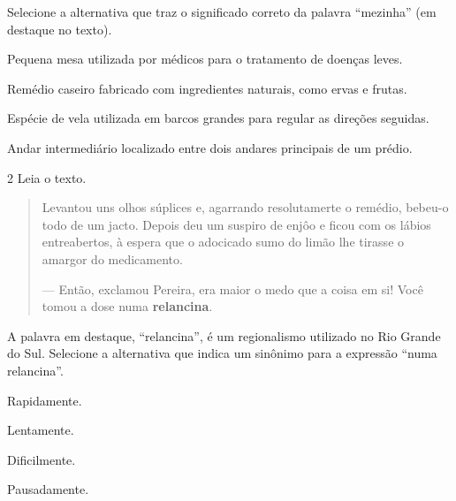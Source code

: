 \noindent{}Selecione a alternativa que traz o significado correto da palavra “mezinha” (em destaque no texto).

\begin{escolha}
\item Pequena mesa utilizada por médicos para o tratamento de doenças leves.

\item Remédio caseiro fabricado com ingredientes naturais, como ervas e frutas.

\item Espécie de vela utilizada em barcos grandes para regular as direções seguidas.

\item Andar intermediário localizado entre dois andares principais de um prédio.
\end{escolha}


\num{2} Leia o texto.

\begin{quote}
Levantou uns olhos súplices e, agarrando resolutamerte o remédio,
bebeu-o todo de um jacto. Depois deu um suspiro de enjôo e ficou com os
lábios entreabertos, à espera que o adocicado sumo do limão lhe tirasse
o amargor do medicamento.

— Então, exclamou Pereira, era maior o medo que a coisa em si! Você
tomou a dose numa \textbf{relancina}.

\end{quote}

A palavra em destaque, “relancina”, é um regionalismo
utilizado no Rio Grande do Sul. Selecione a alternativa que indica um sinônimo
para a expressão “numa relancina”.

\begin{minipage}{.5\textwidth}
\begin{escolha}
\item Rapidamente.

\item Lentamente.

\item Dificilmente.

\item Pausadamente.
\end{escolha}
\end{minipage}

